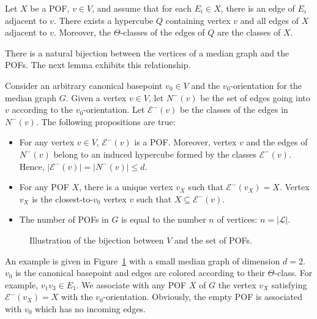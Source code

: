 \documentclass[a4paper,UKenglish,numberwithinsect,cleveref, autoref]{lipics-v2021}
\newcommand{\card}[1]{\left| #1 \right|}
\begin{document}
\begin{lemma}
Let $X$ be a POF, $v \in V$, and assume that for each $E_i \in X$, there is an edge of $E_i$ adjacent to $v$. There exists a hypercube $Q$ containing vertex $v$ and all edges of $X$ adjacent to $v$. Moreover, the $\Theta$-classes of the edges of $Q$ are the classes of $X$.
\label{le:pof_adjacent}
\end{lemma}

There is a natural bijection between the vertices of a median graph and the POFs. The next lemma exhibits this relationship.

\begin{lemma}
Consider an arbitrary canonical basepoint $v_0 \in V$ and the $v_0$-orientation for the median graph $G$. Given a vertex $v \in V$, let $N^-(v)$ be the set of edges going into $v$ according to the $v_0$-orientation. Let $\mathcal{E}^-(v)$ be the classes of the edges in $N^-(v)$. The following propositions are true:
\begin{itemize}
\item For any vertex $v\in V$, $\mathcal{E}^-(v)$ is a POF. Moreover, vertex $v$ and the edges of $N^-(v)$ belong to an induced hypercube formed by the classes $\mathcal{E}^-(v)$. Hence, $\card{\mathcal{E}^-(v)} = \card{N^-(v)} \le d$.
\item For any POF $X$, there is a unique vertex $v_X$ such that $\mathcal{E}^-(v_X) = X$. Vertex $v_X$ is the closest-to-$v_0$ vertex $v$ such that $X \subseteq \mathcal{E}^-(v)$.
\item The number of POFs in $G$ is equal to the number $n$ of vertices: $n = \card{\mathcal{L}}$.
\end{itemize}
\label{le:pof_hypercube}
\end{lemma}

\begin{figure}[h]
\centering
\scalebox{0.95}{}
\caption{Illustration of the bijection between $V$ and the set of POFs.}
\label{fig:vertices_pof}
\end{figure}

An example is given in Figure~\ref{fig:vertices_pof} with a small median graph of dimension $d=2$. $v_0$ is the canonical basepoint  and edges are colored according to  their $\Theta$-class. For example, $v_1v_3 \in E_1$. We associate with any POF $X$ of $G$ the vertex $v_X$ satisfying $\mathcal{E}^-(v_X) = X$ with the $v_0$-orientation. Obviously, the empty POF is associated with $v_0$ which has no incoming edges.
\end{document}
